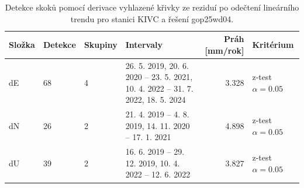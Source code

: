 \begin{table}[H]
\centering
\small
\caption{Detekce skoků pomocí derivace vyhlazené křivky ze reziduí po odečtení lineárního trendu pro stanici KIVC a řešení gop25wd04.}
\label{tab:gop25wd04_stcd_kivc_detr_weighted_1seg_jumps_lowess_derivative}
\begin{tabular}{llllrl}
\toprule
Složka & Detekce & Skupiny & Intervaly & Práh [mm/rok] & Kritérium \\
\midrule
dE & 68 & 4 & 26. 5. 2019, 20. 6. 2020 -- 23. 5. 2021, 10. 4. 2022 -- 31. 7. 2022, 18. 5. 2024 & 3.328 & z-test $\alpha=0.05$ \\
dN & 26 & 2 & 21. 4. 2019 -- 4. 8. 2019, 14. 11. 2020 -- 17. 1. 2021 & 4.898 & z-test $\alpha=0.05$ \\
dU & 39 & 2 & 16. 6. 2019 -- 29. 12. 2019, 10. 4. 2022 -- 12. 6. 2022 & 3.827 & z-test $\alpha=0.05$ \\
\bottomrule
\end{tabular}
\end{table}
